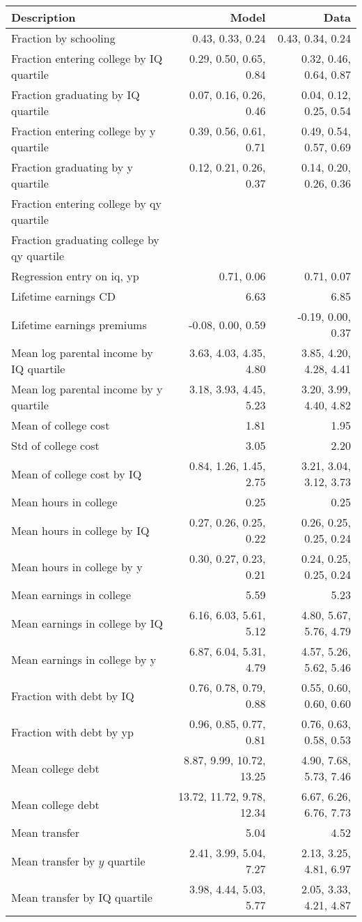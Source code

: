 \begin{tabular}{lrr}
\hline
Description & Model  & Data  \\ 
\hline
Fraction by schooling & 0.43, 0.33, 0.24  & 0.43, 0.34, 0.24  \\ 
Fraction entering college by IQ quartile & 0.29, 0.50, 0.65, 0.84  & 0.32, 0.46, 0.64, 0.87  \\ 
Fraction graduating by IQ quartile & 0.07, 0.16, 0.26, 0.46  & 0.04, 0.12, 0.25, 0.54  \\ 
Fraction entering college by y quartile & 0.39, 0.56, 0.61, 0.71  & 0.49, 0.54, 0.57, 0.69  \\ 
Fraction graduating by y quartile & 0.12, 0.21, 0.26, 0.37  & 0.14, 0.20, 0.26, 0.36  \\ 
Fraction entering college by qy quartile &   &   \\ 
Fraction graduating college by qy quartile &   &   \\ 
Regression entry on iq, yp & 0.71, 0.06  & 0.71, 0.07  \\ 
Lifetime earnings CD & 6.63  & 6.85  \\ 
Lifetime earnings premiums & -0.08, 0.00, 0.59  & -0.19, 0.00, 0.37  \\ 
Mean log parental income by IQ quartile & 3.63, 4.03, 4.35, 4.80  & 3.85, 4.20, 4.28, 4.41  \\ 
Mean log parental income by y quartile & 3.18, 3.93, 4.45, 5.23  & 3.20, 3.99, 4.40, 4.82  \\ 
Mean of college cost & 1.81  & 1.95  \\ 
Std of college cost & 3.05  & 2.20  \\ 
Mean of college cost by IQ & 0.84, 1.26, 1.45, 2.75  & 3.21, 3.04, 3.12, 3.73  \\ 
Mean hours in college & 0.25  & 0.25  \\ 
Mean hours in college by IQ & 0.27, 0.26, 0.25, 0.22  & 0.26, 0.25, 0.25, 0.24  \\ 
Mean hours in college by y & 0.30, 0.27, 0.23, 0.21  & 0.24, 0.25, 0.25, 0.24  \\ 
Mean earnings in college & 5.59  & 5.23  \\ 
Mean earnings in college by IQ & 6.16, 6.03, 5.61, 5.12  & 4.80, 5.67, 5.76, 4.79  \\ 
Mean earnings in college by y & 6.87, 6.04, 5.31, 4.79  & 4.57, 5.26, 5.62, 5.46  \\ 
Fraction with debt by IQ & 0.76, 0.78, 0.79, 0.88  & 0.55, 0.60, 0.60, 0.60  \\ 
Fraction with debt by yp & 0.96, 0.85, 0.77, 0.81  & 0.76, 0.63, 0.58, 0.53  \\ 
Mean college debt & 8.87, 9.99, 10.72, 13.25  & 4.90, 7.68, 5.73, 7.46  \\ 
Mean college debt & 13.72, 11.72, 9.78, 12.34  & 6.67, 6.26, 6.76, 7.73  \\ 
Mean transfer & 5.04  & 4.52  \\ 
Mean transfer by $y$ quartile & 2.41, 3.99, 5.04, 7.27  & 2.13, 3.25, 4.81, 6.97  \\ 
Mean transfer by IQ quartile & 3.98, 4.44, 5.03, 5.77  & 2.05, 3.33, 4.21, 4.87  \\ 
\hline
\end{tabular}%
